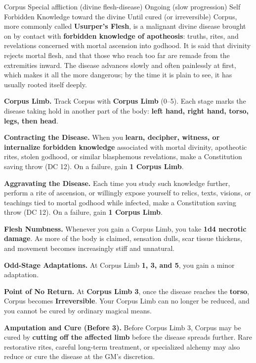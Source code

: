 \documentclass{apotheosis-book}
\begin{document}
\DndSpellHeader%
  {Corpus}
  {Special affliction (divine flesh-disease)}
  {Ongoing (slow progression)}
  {Self}
  {Forbidden Knowledge toward the divine}
  {Until cured (or irreversible)}
Corpus, more commonly called \textbf{Usurper's Flesh}, is a malignant divine disease brought on by contact with \textbf{forbidden knowledge of apotheosis}: truths, rites, and revelations concerned with mortal ascension into godhood. It is said that divinity rejects mortal flesh, and that those who reach too far are remade from the extremities inward. The disease advances slowly and often painlessly at first, which makes it all the more dangerous; by the time it is plain to see, it has usually rooted itself deeply.

\textbf{Corpus Limb.} Track Corpus with \textbf{Corpus Limb} (0--5). Each stage marks the disease taking hold in another part of the body: \textbf{left hand, right hand, torso, legs, then head}.

\textbf{Contracting the Disease.} When you \textbf{learn, decipher, witness, or internalize forbidden knowledge} associated with mortal divinity, apotheotic rites, stolen godhood, or similar blasphemous revelations, make a Constitution saving throw (DC 12). On a failure, gain \textbf{1 Corpus Limb}.

\textbf{Aggravating the Disease.} Each time you study such knowledge further, perform a rite of ascension, or willingly expose yourself to relics, texts, visions, or teachings tied to mortal godhood while infected, make a Constitution saving throw (DC 12). On a failure, gain \textbf{1 Corpus Limb}.

\textbf{Flesh Numbness.} Whenever you gain a Corpus Limb, you take \textbf{1d4 necrotic damage}. As more of the body is claimed, sensation dulls, scar tissue thickens, and movement becomes increasingly stiff and unnatural.

\textbf{Odd-Stage Adaptations.} At Corpus Limb \textbf{1, 3, and 5}, you gain a minor adaptation.

\textbf{Point of No Return.} At \textbf{Corpus Limb 3}, once the disease reaches the \textbf{torso}, Corpus becomes \textbf{Irreversible}. Your Corpus Limb can no longer be reduced, and you cannot be cured by ordinary magical means.

\textbf{Amputation and Cure (Before 3).} Before Corpus Limb 3, Corpus may be cured by \textbf{cutting off the affected limb} before the disease spreads further. Rare restorative rites, careful long-term treatment, or specialized alchemy may also reduce or cure the disease at the GM's discretion.
\end{document}
